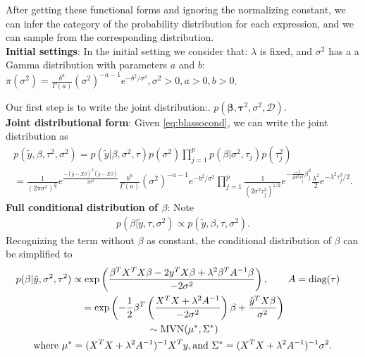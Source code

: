 After getting these functional forms and ignoring the normalizing constant, we can infer the category of the probability distribution for each expression, and we can sample from the corresponding distribution.\\
\textbf{Initial settings}:
In the initial setting we consider that: $\lambda$ is fixed, and $\sigma^2$ has a a Gamma distribution with parameters $a$ and $b$: $\pi(\sigma^2) = \frac{b^a}{\Gamma(a)} (\sigma^2)^{-a-1}e^{-b^2/\sigma^2},\sigma^2>0,a>0,b>0$.

\noindent 
Our first step is to write the joint distribution:.
$p(\mathbf{\beta},\mathbf{\tau}^2,\sigma^{2},\mathcal{D})$.\\
\textbf{Joint distributional form}:
Given \autoref{eq:blassocond}, we can write the joint distribution as
\begin{equation}
	\begin{multlined}
		p(\tilde{y},\beta,\tau^2,\sigma^2) = p(\tilde{y}|\beta,\sigma^2,\tau)p(\sigma^2)\prod_{j=1}^p p(\beta|\sigma^2,\tau_j)p(\tau_j^2)\\
		=\frac{1}{(2\pi\sigma^2)^{\frac{n}{2}}} e^{\frac{-(\tilde{y} -X\beta)^T(\tilde{y}-X\beta)}{2\sigma^2}}
		\frac{b^a}{\Gamma(a)} (\sigma^2)^{-a-1}e^{-b^2/\sigma^2}
		\prod_{j=1}^p \frac{1}{(2\sigma^2\tau_j^2)^{1/2}}e^{-\frac{-1}{2\sigma^2\tau_j^2}\beta_j^2}\frac{\lambda^2}{2}e^{-\lambda^2\tau_j^2/2}.
	\end{multlined}
\end{equation}
\textbf{Full conditional distribution of $\beta$}: Note
\begin{equation}
	\begin{multlined}
		p(\beta | \tilde{y},\tau,\sigma^2) \propto  	p(\tilde{y},\beta,\tau,\sigma^2).
	\end{multlined}
\end{equation}
Recognizing the term without $\beta$ as constant, the conditional distribution of $\beta$ can be simplified to
\begin{equation}
	\begin{multlined}
		p(\beta|\tilde{y},\sigma^2,\tau^2) \propto \textnormal{exp}\left(\frac{\beta^TX^TX\beta - 2y^TX\beta +\lambda^2\beta^TA^{-1}\beta}{-2\sigma^2} \right), \qquad  A = \text{diag}(\tau)\\
		=  \textnormal{exp}\left(
  -\frac{1}{2}\beta^T\left(\frac{X^TX + \lambda^2A^{-1}}{-2\sigma^2}\right)\beta + \frac{\tilde{y}^TX\beta}{\sigma^2} \right)\\
		\sim \textnormal{MVN}(\mu^*,\Sigma^*)\\
		\textnormal{where } \mu^* = (X^TX+\lambda^2A^{-1})^{-1}X^Ty, \textnormal{and } \Sigma^* = (X^TX+\lambda^2A^{-1})^{-1}\sigma^2.\\
	\end{multlined}
\end{equation}
